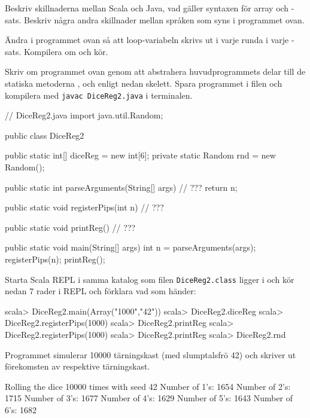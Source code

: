 
\Subtask Beskriv skillnaderna mellan Scala och Java, vad gäller syntaxen för array och -sats. Beskriv några andra skillnader mellan språken som syns i programmet ovan.

\Subtask Ändra i programmet ovan så att loop-variabeln  skrivs ut i varje runda i varje -sats. Kompilera om och kör.

\Subtask Skriv om programmet ovan genom att abstrahera huvudprogrammets delar till de statiska metoderna ,  och  enligt nedan skelett. Spara programmet i filen  och kompilera med \texttt{javac DiceReg2.java} i terminalen.

\begin{Code}[language=Java]
// DiceReg2.java
import java.util.Random;

public class DiceReg2 {
    public static int[] diceReg = new int[6];
    private static Random rnd = new Random();

    public static int parseArguments(String[] args) {
        // ???
        return n;
    }

    public static void registerPips(int n){
        // ???
    }

    public static void printReg() {
        // ???
    }

    public static void main(String[] args) {
        int n = parseArguments(args);
        registerPips(n);
        printReg();
    }
}
\end{Code}

\Subtask Starta Scala REPL i samma katalog som filen \texttt{DiceReg2.class} ligger i och kör nedan 7 rader i REPL och förklara vad som händer:
\begin{REPL}
scala> DiceReg2.main(Array("1000","42"))
scala> DiceReg2.diceReg
scala> DiceReg2.registerPips(1000)
scala> DiceReg2.printReg
scala> DiceReg2.registerPips(1000)
scala> DiceReg2.printReg
scala> DiceReg2.rnd
\end{REPL}

\SOLUTION

\TaskSolved \what

\SubtaskSolved Programmet simulerar 10000 tärningskast (med slumptalsfrö 42) och skriver ut förekomsten av respektive tärningskast.

\begin{REPL}
Rolling the dice 10000 times with seed 42
Number of 1's: 1654
Number of 2's: 1715
Number of 3's: 1677
Number of 4's: 1629
Number of 5's: 1643
Number of 6's: 1682
\end{REPL}

